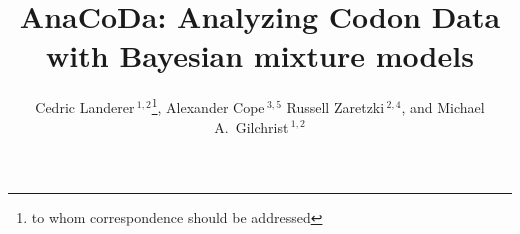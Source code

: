 \documentclass{bioinfo}
\begin{document}

\title[AnaCoDa]{AnaCoDa: Analyzing Codon Data with Bayesian mixture models}
\author[
Landerer \textit{et~al}]{Cedric Landerer\,$^{1,2}$\footnote{
to whom correspondence should be addressed
},
Alexander Cope\,$^{3,5}$
Russell Zaretzki\,$^{2,4}$, and
Michael A.~Gilchrist\,$^{1,2}$
}
\address{$^{1}$
Department of Ecology and Evolutionary Biology, University of Tennessee, Knoxville, TN, USA.
$^{2}$National Institute for Mathematical and Biological Synthesis.
$^{3}$Genome Science and Technology, University of Tennessee, Knoxville, TN, USA.
$^{4}$Department of Statistics, Operations, and Management Science,
University of Tennessee, Knoxville, TN, USA.
$^{5}$Oak Ridge National Laboratory, Oak Ridge, TN, USA.} 


\maketitle
\end{document}

